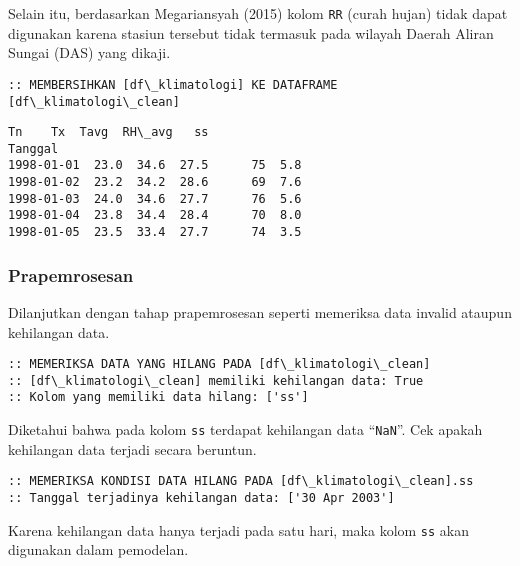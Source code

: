 \documentclass[11pt]{article}
\makeatletter
\newcommand{\boxspacing}{\kern\kvtcb@left@rule\kern\kvtcb@boxsep}
\newcommand{\prompt}[4]{
        \ttfamily\llap{{\color{#2}[#3]:\hspace{3pt}#4}}\vspace{-\baselineskip}
    }
\makeatother
\begin{document}
Selain itu, berdasarkan Megariansyah (2015) kolom \texttt{RR} (curah
hujan) tidak dapat digunakan karena stasiun tersebut tidak termasuk pada
wilayah Daerah Aliran Sungai (DAS) yang dikaji.

    \begin{Verbatim}[commandchars=\\\{\}]
:: MEMBERSIHKAN [df\_klimatologi] KE DATAFRAME [df\_klimatologi\_clean]
    \end{Verbatim}

            \begin{tcolorbox}[breakable, size=fbox, boxrule=.5pt, pad at break*=1mm, opacityfill=0]
\prompt{Out}{outcolor}{28}{\boxspacing}
\begin{Verbatim}[commandchars=\\\{\}]
              Tn    Tx  Tavg  RH\_avg   ss
Tanggal
1998-01-01  23.0  34.6  27.5      75  5.8
1998-01-02  23.2  34.2  28.6      69  7.6
1998-01-03  24.0  34.6  27.7      76  5.6
1998-01-04  23.8  34.4  28.4      70  8.0
1998-01-05  23.5  33.4  27.7      74  3.5
\end{Verbatim}
\end{tcolorbox}
        
    \hypertarget{prapemrosesan}{%
\subsubsection{Prapemrosesan}\label{prapemrosesan}}

Dilanjutkan dengan tahap prapemrosesan seperti memeriksa data invalid
ataupun kehilangan data.

    \begin{Verbatim}[commandchars=\\\{\}]
:: MEMERIKSA DATA YANG HILANG PADA [df\_klimatologi\_clean]
:: [df\_klimatologi\_clean] memiliki kehilangan data: True
:: Kolom yang memiliki data hilang: ['ss']
    \end{Verbatim}

    Diketahui bahwa pada kolom \texttt{ss} terdapat kehilangan data
``\texttt{NaN}''. Cek apakah kehilangan data terjadi secara beruntun.

    \begin{Verbatim}[commandchars=\\\{\}]
:: MEMERIKSA KONDISI DATA HILANG PADA [df\_klimatologi\_clean].ss
:: Tanggal terjadinya kehilangan data: ['30 Apr 2003']
    \end{Verbatim}

    Karena kehilangan data hanya terjadi pada satu hari, maka kolom
\texttt{ss} akan digunakan dalam pemodelan.
\end{document}
